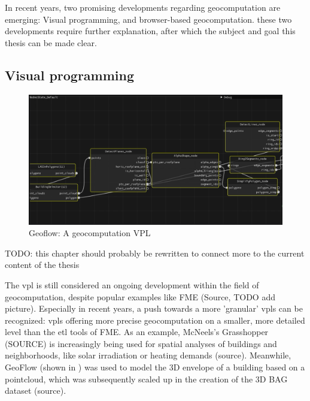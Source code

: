 In recent years, two promising developments regarding geocomputation are emerging:
Visual programming, and browser-based geocomputation. 
these two developments require further explanation, after which the subject and goal this thesis can be made clear.

\subsection*{Visual programming}

\begin{figure}
  \centering
  \graphicspath{{../../assets/images/background/geo-vpl/}}
  \includegraphics[width=\linewidth]{geoflow.png}
  \caption{Geoflow: A geocomputation VPL}
  \label{fig:1:geoflow}
\end{figure}

\begin{note}
  TODO: this chapter should probably be rewritten to connect more to the current content of the thesis
\end{note}

The \ac{vpl} is still considered an ongoing development within the field of geocomputation, despite popular examples like FME (Source, TODO add picture). 
Especially in recent years, a push towards a more 'granular' \ac{vpl}s can be recognized: 
\ac{vpl}s offering more precise geocomputation on a smaller, more detailed level than the \ac{etl} tools of FME. 
As an example, McNeels's Grasshopper (SOURCE) is increasingly being used for spatial analyses of buildings and neighborhoods, like solar irradiation or heating demands (source). 
Meanwhile, GeoFlow (shown in ) was used to model the 3D envelope of a building based on a pointcloud, which was subsequently scaled up in the creation of the 3D BAG dataset (source).

